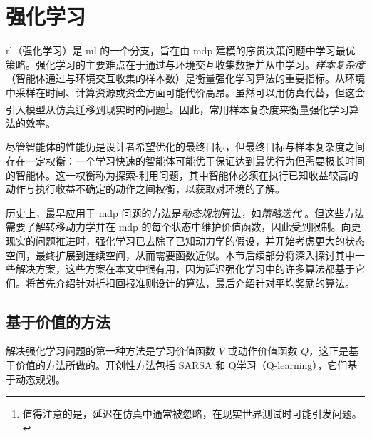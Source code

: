 \section{强化学习}
\label{sec:rl}

\gls{rl}（强化学习）是 \gls{ml} 的一个分支，旨在由 \gls{mdp} 建模的序贯决策问题中学习最优策略。强化学习的主要难点在于通过与环境交互收集数据并从中学习。\emph{样本复杂度}（智能体通过与环境交互收集的样本数）是衡量强化学习算法的重要指标。从环境中采样在时间、计算资源或资金方面可能代价高昂。虽然可以用仿真代替，但这会引入模型从仿真迁移到现实时的问题\footnote{值得注意的是，延迟在仿真中通常被忽略，在现实世界测试时可能引发问题。}。因此，常用样本复杂度来衡量强化学习算法的效率。

尽管智能体的性能仍是设计者希望优化的最终目标，但最终目标与样本复杂度之间存在一定权衡：一个学习快速的智能体可能优于保证达到最优行为但需要极长时间的智能体。这一权衡称为探索-利用问题，其中智能体必须在执行已知收益较高的动作与执行收益不确定的动作之间权衡，以获取对环境的了解。

历史上，最早应用于 \gls{mdp} 问题的方法是\emph{动态规划}算法，如\emph{策略迭代} \cite{howard1960dynamic}。但这些方法需要了解转移动力学并在 \gls{mdp} 的每个状态中维护价值函数，因此受到限制。向更现实的问题推进时，强化学习已去除了已知动力学的假设，并开始考虑更大的状态空间，最终扩展到连续空间，从而需要函数近似。本节后续部分将深入探讨其中一些解决方案，这些方案在本文中很有用，因为延迟强化学习中的许多算法都基于它们。将首先介绍针对折扣回报准则设计的算法，最后介绍针对平均奖励的算法。

\subsection{基于价值的方法}
解决强化学习问题的第一种方法是学习价值函数 $V$ 或动作价值函数 $Q$，这正是基于价值的方法所做的。开创性方法包括 SARSA \cite{rummery1994line} 和 Q学习（Q-learning）\cite{watkins1989learning}，它们基于动态规划。

